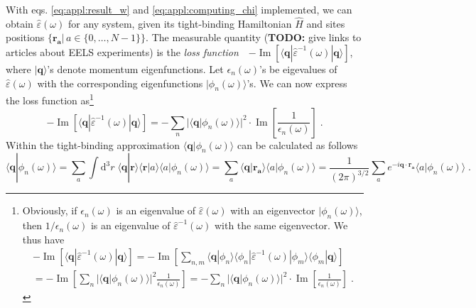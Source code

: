\documentclass[a4paper,12pt]{article}
\begin{document}
    With eqs. \eqref{eq:appl:result_w} and \eqref{eq:appl:computing_chi} implemented, we can obtain $\hat \varepsilon(\omega)$ for any system, given its tight-binding Hamiltonian $\hat H$ and sites positions $\big\{\mathbf{r_a} |\, a \in \{0,\dots,N-1\}\big\}$. The measurable quantity (\textbf{TODO:} give links to articles about EELS experiments) is the \textit{loss function}\ \  $-\!\operatorname{Im}\left[\langle \mathbf{q} | \hat\varepsilon^{-1}(\omega) | \mathbf{q} \rangle\right]$, where $|\mathbf{q}\rangle$'s denote momentum eigenfunctions. Let $\epsilon_n(\omega)$'s be eigevalues of $\hat\varepsilon(\omega)$ with the corresponding eigenfunctions $|\phi_n(\omega)\rangle$'s. We can now express the loss function as\footnote{ %
    Obviously, if $\epsilon_n(\omega)$ is an eigenvalue of $\hat \varepsilon(\omega)$ with an eigenvector $|\phi_n(\omega)\rangle$, then $1\!/\!\epsilon_n(\omega)$ is an eigenvalue of $\hat \varepsilon^{-1}(\omega)$ with the same eigenvector. We thus have
    \begin{multline*}
    -\operatorname{Im}\left[\langle \mathbf{q} | \hat\varepsilon^{-1}(\omega) | \mathbf{q} \rangle\right] = -\operatorname{Im}\left[ \sum_{n,m} \langle \mathbf{q} | \phi_n \rangle \langle \phi_n | \hat \varepsilon^{-1}(\omega) | \phi_m \rangle \langle \phi_m | \mathbf{q} \rangle \right] \\ = -\operatorname{Im}\left[ \sum_{n} |\langle \mathbf{q} | \phi_n(\omega) \rangle|^2 \frac{1}{\epsilon_n(\omega)} \right] = - \sum_{n} |\langle \mathbf{q} | \phi_n(\omega) \rangle|^2\cdot \operatorname{Im}\left[ \frac{1}{\epsilon_n(\omega)} \right]\; .
    \end{multline*}
} %
    \begin{equation*}
        -\operatorname{Im}\left[\langle \mathbf{q} | \hat\varepsilon^{-1}(\omega) | \mathbf{q} \rangle\right] = - \sum_{n} |\langle \mathbf{q} | \phi_n(\omega) \rangle|^2\cdot \operatorname{Im}\left[ \frac{1}{\epsilon_n(\omega)} \right]\; .
    \end{equation*}
    Within the tight-binding approximation $\langle \mathbf{q} | \phi_n(\omega) \rangle$ can be calculated as follows
    \begin{equation*}
        \langle \mathbf{q} | \phi_n(\omega) \rangle = \sum_{a} \!\int\!\!\text{d}^3 r \; \langle \mathbf{q} | \mathbf{r} \rangle \langle \mathbf{r} | a \rangle \langle a | \phi_n(\omega) \rangle = \sum_{a} \langle \mathbf{q} | \mathbf{r_a} \rangle \langle a | \phi_n(\omega) \rangle = \frac{1}{(2\pi)^{3/2}} \sum_{a} e^{-i\mathbf{q}\cdot\mathbf{r_a}} \langle a | \phi_n(\omega) \rangle \; .
    \end{equation*}
\end{document}

